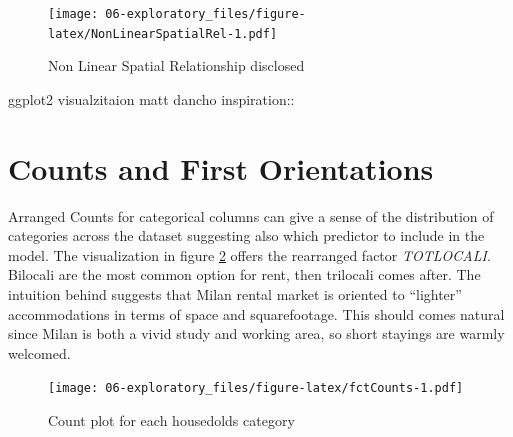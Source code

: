 \documentclass[
  12pt,
  a4paper,
  oneside]{book}
\theoremstyle{definition}
\theoremstyle{definition}
\theoremstyle{definition}
\theoremstyle{remark}
\begin{document}
\begin{figure}
\centering
\texttt{[image: 06-exploratory\_files/figure-latex/NonLinearSpatialRel-1.pdf]}
\caption{\label{fig:NonLinearSpatialRel}Non Linear Spatial Relationship disclosed}
\end{figure}

ggplot2 visualzitaion matt dancho inspiration::

\hypertarget{counts-and-first-orientations}{%
\section{Counts and First Orientations}\label{counts-and-first-orientations}}

Arranged Counts for categorical columns can give a sense of the distribution of categories across the dataset suggesting also which predictor to include in the model. The visualization in figure \ref{fig:fctCounts} offers the rearranged factor \emph{TOTLOCALI}.
Bilocali are the most common option for rent, then trilocali comes after. The intuition behind suggests that Milan rental market is oriented to ``lighter'' accommodations in terms of space and squarefootage. This should comes natural since Milan is both a vivid study and working area, so short stayings are warmly welcomed.

\begin{figure}
\centering
\texttt{[image: 06-exploratory\_files/figure-latex/fctCounts-1.pdf]}
\caption{\label{fig:fctCounts}Count plot for each housedolds category}
\end{figure}
\end{document}
